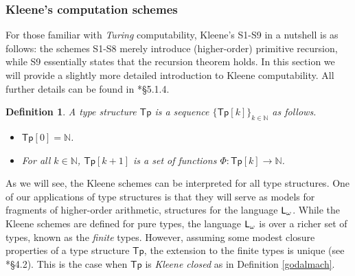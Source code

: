 \documentclass[reqno]{amsart}
\newtheorem{definition}[thm]{Definition}
\def\N{{\mathbb  N}}
\def\L{\textsf{\textup{L}}}
\newcommand{\Tp}{\mathsf{Tp}}
\numberwithin{equation}{section}
\numberwithin{thm}{section}
\begin{document}
\subsubsection{Kleene's computation schemes}\label{esnaain}
For those familiar with \emph{Turing} computability, Kleene's S1-S9 in a nutshell is as follows: the schemes S1-S8 merely introduce (higher-order) primitive recursion, while S9 essentially states that the
recursion theorem holds. In this section we will provide a slightly more detailed introduction to Kleene computability.  All further details can be found in  \cite{longmann}*{\S 5.1.4}.
\begin{definition}{\em A \emph{type structure} ${ \Tp}$ is a sequence $\{\Tp[k]\}_{k \in \N}$ as follows.
\begin{itemize} 
\item $\Tp[0] = \N$.
\item For all $k \in \N$, $\Tp[k+1]$ is a set of functions $\Phi:\Tp[k] \rightarrow \N$.
\end{itemize}}
\end{definition} As we will see, the Kleene schemes can be interpreted for all type structures. One of our applications of   type structures is that they will serve as models for  fragments of higher-order arithmetic, structures for the language $\L_{\omega}$. While the Kleene schemes are defined for pure types, the language $\L_{\omega}$ is over a richer set of types, known as the \emph{finite} types. However, assuming some modest closure properties of a type structure $ \Tp$, the extension to the finite types is unique (see \cite{longmann}*{\S4.2}). This is the case when $\Tp$ is \emph{Kleene closed} as in Definition \ref{godalmach}.

\smallskip
\end{document}
